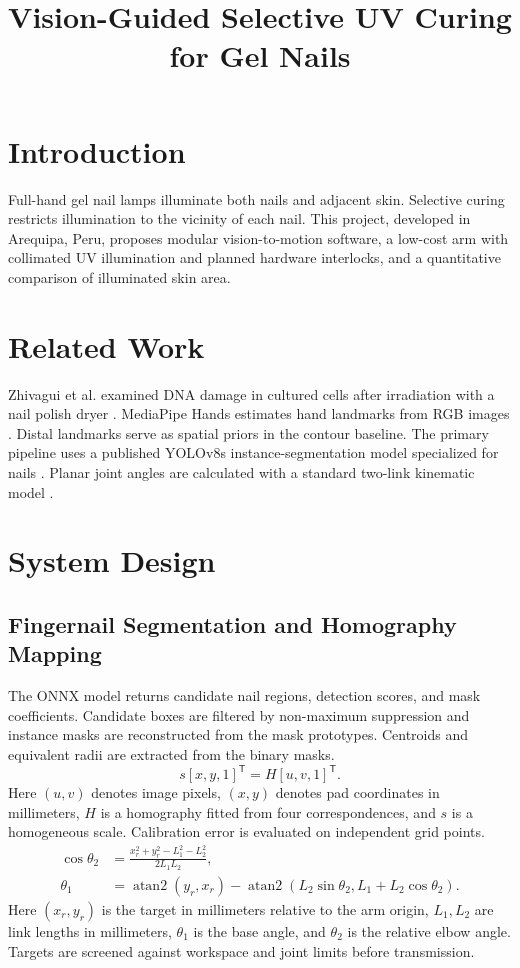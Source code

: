 \documentclass[conference]{IEEEtran}
\title{Vision-Guided Selective UV Curing for Gel Nails}
\author{\IEEEauthorblockN{Author names pending}}
\begin{document}
\maketitle
\section{Introduction}
Full-hand gel nail lamps illuminate both nails and adjacent skin. Selective curing restricts illumination to the vicinity of each nail. This project, developed in Arequipa, Peru, proposes modular vision-to-motion software, a low-cost arm with collimated UV illumination and planned hardware interlocks, and a quantitative comparison of illuminated skin area.
\section{Related Work}
Zhivagui et al. examined DNA damage in cultured cells after irradiation with a nail polish dryer \cite{zhivagui}. MediaPipe Hands estimates hand landmarks from RGB images \cite{mediapipe}. Distal landmarks serve as spatial priors in the contour baseline. The primary pipeline uses a published YOLOv8s instance-segmentation model specialized for nails \cite{nailseg}. Planar joint angles are calculated with a standard two-link kinematic model \cite{lynch}.
\section{System Design}
\setcounter{subsection}{2}
\subsection{Fingernail Segmentation and Homography Mapping}
The ONNX model returns candidate nail regions, detection scores, and mask coefficients. Candidate boxes are filtered by non-maximum suppression and instance masks are reconstructed from the mask prototypes. Centroids and equivalent radii are extracted from the binary masks.
\begin{equation}
s[x,y,1]^\mathsf{T}=H[u,v,1]^\mathsf{T}.
\end{equation}
Here $(u,v)$ denotes image pixels, $(x,y)$ denotes pad coordinates in millimeters, $H$ is a homography fitted from four correspondences, and $s$ is a homogeneous scale. Calibration error is evaluated on independent grid points.
\begin{align}
\cos\theta_2 &= \frac{x_r^2+y_r^2-L_1^2-L_2^2}{2L_1L_2},\\
\theta_1 &= \operatorname{atan2}(y_r,x_r)-\operatorname{atan2}(L_2\sin\theta_2,L_1+L_2\cos\theta_2).
\end{align}
Here $(x_r,y_r)$ is the target in millimeters relative to the arm origin, $L_1,L_2$ are link lengths in millimeters, $\theta_1$ is the base angle, and $\theta_2$ is the relative elbow angle. Targets are screened against workspace and joint limits before transmission.
\end{document}
